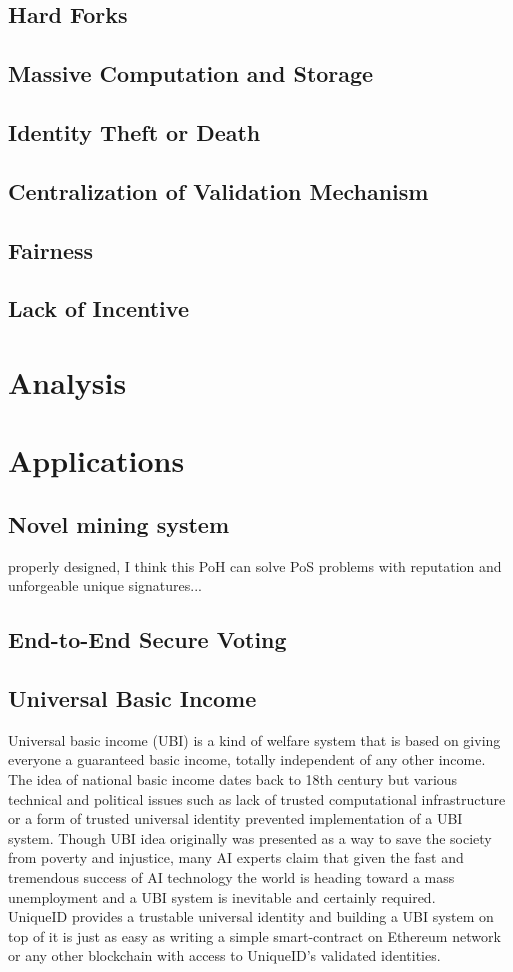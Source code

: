 \documentclass{article}
\begin{document}
\subsection{Hard Forks}
\subsection{Massive Computation and Storage}
\subsection{Identity Theft or Death}
\subsection{Centralization of Validation Mechanism}
\subsection{Fairness}
\subsection{Lack of Incentive}


\section{Analysis}

 
\section{Applications}

\subsection{Novel mining system}
properly designed, I think this PoH can solve PoS problems with reputation and unforgeable unique signatures...

\subsection{End-to-End Secure Voting}
\subsection{Universal Basic Income}
Universal basic income (UBI) is a kind of welfare system that is based on giving everyone a guaranteed basic income, totally independent of any other income. The idea of national basic income dates back to 18th century but various technical and political issues such as lack of trusted computational infrastructure or a form of trusted universal identity prevented implementation of a UBI system. Though UBI idea originally was presented as a way to save the society from poverty and injustice, many AI experts claim that given the fast and tremendous success of AI technology the world is heading toward a mass unemployment and a UBI system is inevitable and certainly required.\\
UniqueID provides a trustable universal identity and building a UBI system on top of it is just as easy as writing a simple smart-contract on Ethereum network or any other blockchain with access to UniqueID's validated identities. 
\end{document}
